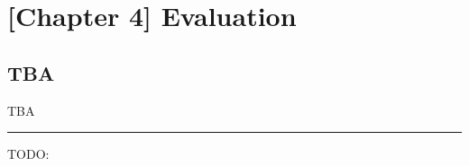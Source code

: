 \documentclass[runningheads]{llncs}
\begin{document}
\chapter{[Chapter 4] Evaluation}

\section{TBA}

TBA

\noindent\rule{12cm}{0.4pt}

TODO:
\end{document}
